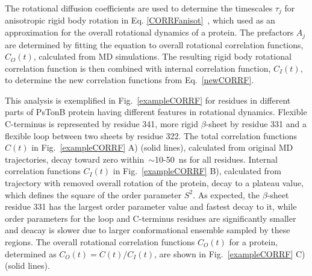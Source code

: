 \documentclass[pre,aps,floatfix,authordate1-4,twocolumn]{revtex4-1}
\begin{document}
The rotational diffusion coefficients are used to determine
the timescales $\tau_j$ for anisotropic rigid body rotation in Eq. \ref{CORRFanisot}~\cite{Note1},
which used as an approximation for the overall rotational dynamics of a protein.
The prefactors $A_j$ are determined by fitting the equation to overall rotational
correlation functions, $C_O(t)$, calculated from MD simulations.
The resulting rigid body rotational correlation function is then
combined with internal correlation function, $C_I(t)$,
to determine the new correlation functions from Eq.~\ref{newCORRF}.

This analysis is exemplified in Fig.~\ref{exampleCORRF} for residues
in different parts of PsTonB protein having different features in rotational dynamics.
Flexible C-terminus is represented by residue 341,
more rigid $\beta$-sheet by residue 331 and a
flexible loop between two sheets by residue 322. 
The total correlation functions $C(t)$ in Fig.~\ref{exampleCORRF} A) (solid lines),
calculated from original MD trajectories,
decay toward zero within~$\sim$10-50~ns for all residues. 
Internal correlation functions $C_I(t)$ in Fig.~\ref{exampleCORRF} B),
calculated from trajectory with removed overall rotation of the protein,
decay to a plateau value, which defines the square of the order parameter $S^2$.
As expected, the $\beta$-sheet residue 331 has the largest order parameter value
and fastest decay to it, while order parameters for the loop and C-terminus residues are
significantly smaller and deacay is slower due to larger conformational ensemble
sampled by these regions. The overall rotational correlation functions $C_O(t)$
for a protein, determined as $C_O(t)=C(t)/C_I(t)$, are shown in Fig.~\ref{exampleCORRF} C) (solid lines).
\end{document}
